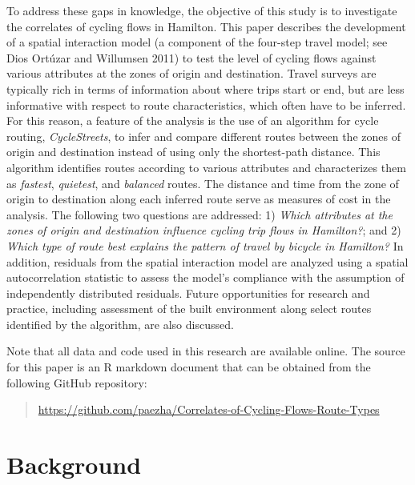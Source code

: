 \documentclass[smallextended]{svjour3}       %
\begin{document}
To address these gaps in knowledge, the objective of this study is to
investigate the correlates of cycling flows in Hamilton. This paper
describes the development of a spatial interaction model (a component of
the four-step travel model; see Dios Ortúzar and Willumsen 2011) to test
the level of cycling flows against various attributes at the zones of
origin and destination. Travel surveys are typically rich in terms of
information about where trips start or end, but are less informative
with respect to route characteristics, which often have to be inferred.
For this reason, a feature of the analysis is the use of an algorithm
for cycle routing, \emph{CycleStreets}, to infer and compare different
routes between the zones of origin and destination instead of using only
the shortest-path distance. This algorithm identifies routes according
to various attributes and characterizes them as \emph{fastest},
\emph{quietest}, and \emph{balanced} routes. The distance and time from
the zone of origin to destination along each inferred route serve as
measures of cost in the analysis. The following two questions are
addressed: 1) \emph{Which attributes at the zones of origin and
destination influence cycling trip flows in Hamilton?}; and 2)
\emph{Which type of route best explains the pattern of travel by bicycle
in Hamilton?} In addition, residuals from the spatial interaction model
are analyzed using a spatial autocorrelation statistic to assess the
model's compliance with the assumption of independently distributed
residuals. Future opportunities for research and practice, including
assessment of the built environment along select routes identified by
the algorithm, are also discussed.

Note that all data and code used in this research are available online.
The source for this paper is an R markdown document that can be obtained
from the following GitHub repository:

\begin{quote}
\url{https://github.com/paezha/Correlates-of-Cycling-Flows-Route-Types}
\end{quote}

\hypertarget{sec:background}{%
\section{Background}\label{sec:background}}
\end{document}
